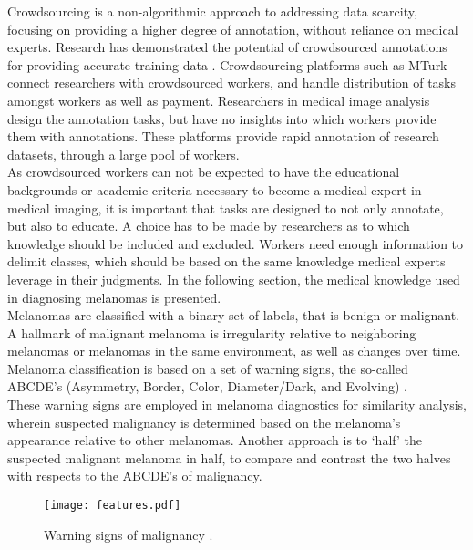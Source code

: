\documentclass[../report.tex]{subfiles}
\begin{document}
Crowdsourcing is a non-algorithmic approach to addressing data scarcity, focusing on providing a higher degree of annotation, without reliance on medical experts. Research has demonstrated the potential of crowdsourced annotations for providing accurate training data \cite{Cheplygina2020CrowdDetective}. Crowdsourcing platforms such as MTurk \cite{mturk} connect researchers with crowdsourced workers, and handle distribution of tasks amongst workers as well as payment. Researchers in medical image analysis design the annotation tasks, but have no insights into which workers provide them with annotations. These platforms provide rapid annotation of research datasets, through a large pool of workers. \\

As crowdsourced workers can not be expected to have the educational backgrounds or academic criteria necessary to become a medical expert in medical imaging, it is important that tasks are designed to not only annotate, but also to educate. A choice has to be made by researchers as to which knowledge should be included and excluded. Workers need enough information to delimit classes, which should be based on the same knowledge medical experts leverage in their judgments. In the following section, the medical knowledge used in diagnosing melanomas is presented. \\


Melanomas are classified with a binary set of labels, that is benign or malignant. A hallmark of malignant melanoma is irregularity relative to neighboring  melanomas or melanomas in the same environment, as well as changes over time. Melanoma classification is based on a set of warning signs, the so-called ABCDE’s (Asymmetry, Border, Color, Diameter/Dark, and Evolving) \cite{Halpern2021Warning}. \\

These warning signs are employed in melanoma diagnostics for similarity analysis, wherein suspected malignancy is determined based on the melanoma’s appearance relative to other melanomas. Another approach is to ‘half’ the suspected malignant melanoma in half, to compare and contrast the two halves with respects to the ABCDE’s of malignancy.

\begin{figure}[h]
\centering
\texttt{[image: features.pdf]}
\caption{Warning signs of malignancy \cite{Halpern2021Warning}.}
\label{figure:ABC}
\end{figure}
\end{document}
